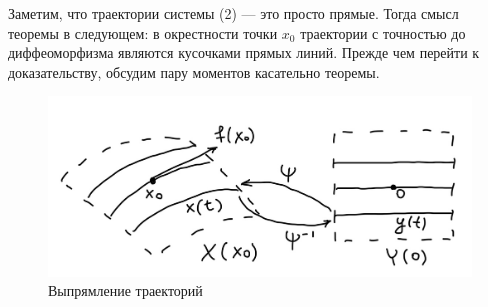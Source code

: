 Заметим, что траектории системы (2) --- это просто прямые. Тогда смысл теоремы в следующем: в окрестности точки $x_0$ траектории с точностью до диффеоморфизма являются кусочками прямых линий. Прежде чем перейти к доказательству, обсудим пару моментов касательно теоремы.
\begin{figure}[h]
    \includegraphics[scale=0.25]{trajectory-straightening}
    \centering
    \caption{Выпрямление траекторий}
\end{figure}
